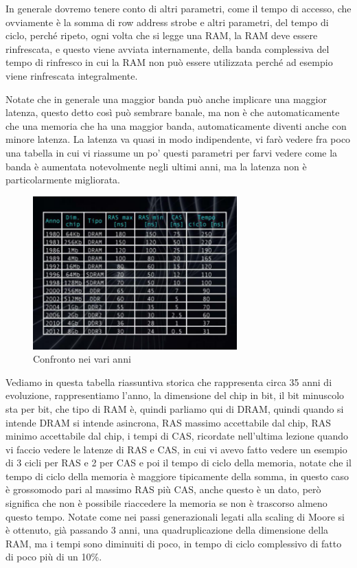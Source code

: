 In generale dovremo tenere conto di altri parametri, come il tempo di accesso, che ovviamente è la somma di row address strobe e altri parametri, del tempo di ciclo, perché ripeto, ogni volta che si legge una RAM, la RAM deve essere rinfrescata, e questo viene avviata internamente, della banda complessiva del tempo di rinfresco in cui la RAM non può essere utilizzata perché ad esempio viene rinfrescata integralmente.

Notate che in generale una maggior banda può anche implicare una maggior latenza, questo detto così può sembrare banale, ma non è che automaticamente che una memoria che ha una maggior banda, automaticamente diventi anche con minore latenza.
La latenza va quasi in modo indipendente, vi farò vedere fra poco una tabella in cui vi riassume un po' questi parametri per farvi vedere come la banda è aumentata notevolmente negli ultimi anni, ma la latenza non è particolarmente migliorata.

\FloatBarrier
\begin{figure}[H]
  \centering
  \includegraphics[width=0.70\textwidth,
                    trim=10 30 10 40, %
                    clip]
                    {images/Lez05_p01_fig_06.png}
  \caption{Confronto nei vari anni}
  \label{fig:Lez05_p01_fig_06}
\end{figure}
\FloatBarrier
\noindent

Vediamo in questa tabella riassuntiva storica che rappresenta circa 35 anni di evoluzione, rappresentiamo l'anno, la dimensione del chip in bit, il bit minuscolo sta per bit, che tipo di RAM è, quindi parliamo qui di DRAM, quindi quando si intende DRAM si intende asincrona, RAS massimo accettabile dal chip, RAS minimo accettabile dal chip, i tempi di CAS, ricordate nell'ultima lezione quando vi faccio vedere le latenze di RAS e CAS, in cui vi avevo fatto vedere un esempio di 3 cicli per RAS e 2 per CAS e poi il tempo di ciclo della memoria, notate che il tempo di ciclo della memoria è maggiore tipicamente della somma, in questo caso è grossomodo pari al massimo RAS più CAS, anche questo è un dato, però significa che non è possibile riaccedere la memoria se non è trascorso almeno questo tempo.
Notate come nei passi generazionali legati alla scaling di Moore si è ottenuto, già passando 3 anni, una quadruplicazione della dimensione della RAM, ma i tempi sono diminuiti di poco, in tempo di ciclo complessivo di fatto di poco più di un 10\%.

